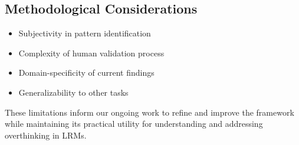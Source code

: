 \subsection{Methodological Considerations}
\begin{itemize}
    \item Subjectivity in pattern identification
    \item Complexity of human validation process
    \item Domain-specificity of current findings
    \item Generalizability to other tasks
\end{itemize}

These limitations inform our ongoing work to refine and improve the framework while maintaining its practical utility for understanding and addressing overthinking in LRMs.

